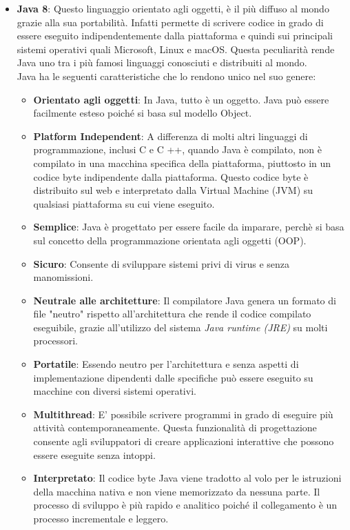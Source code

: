 \begin{itemize}
\item \textbf{Java 8}: Questo linguaggio orientato agli oggetti, è il più diffuso al mondo grazie alla sua portabilità. Infatti permette di scrivere codice in grado di essere eseguito indipendentemente dalla piattaforma e quindi sui principali sistemi operativi quali Microsoft, Linux e macOS. Questa peculiarità rende Java uno tra i più famosi linguaggi conosciuti e distribuiti al mondo.
\\Java ha le seguenti caratteristiche che lo rendono unico nel suo genere:
\begin{itemize}
\item \textbf{Orientato agli oggetti}: In Java, tutto è un oggetto. Java può essere facilmente esteso poiché si basa sul modello Object.
\item \textbf{Platform Independent}: A differenza di molti altri linguaggi di programmazione, inclusi C e C ++, quando Java è compilato, non è compilato in una macchina specifica della piattaforma, piuttosto in un codice byte indipendente dalla piattaforma. Questo codice byte è distribuito sul web e interpretato dalla Virtual Machine (JVM) su qualsiasi piattaforma su cui viene eseguito.
\item \textbf{Semplice}: Java è progettato per essere facile da imparare, perchè si basa sul concetto della programmazione orientata agli oggetti (OOP).
\item \textbf{Sicuro}: Consente di sviluppare sistemi privi di virus e senza manomissioni.
\item \textbf{Neutrale alle architetture}: Il compilatore Java genera un formato di file "neutro" rispetto all'architettura che rende il codice compilato eseguibile,  grazie all'utilizzo del sistema \textit{Java runtime (JRE)} su molti processori.
\item \textbf{Portatile}: Essendo neutro per l'architettura e senza aspetti di implementazione dipendenti dalle specifiche può essere eseguito su macchine con diversi sistemi operativi.
\item \textbf{Multithread}: E' possibile scrivere programmi in grado di eseguire più attività contemporaneamente. Questa funzionalità di progettazione consente agli sviluppatori di creare applicazioni interattive che possono essere eseguite senza intoppi.
\item \textbf{Interpretato}: Il codice byte Java viene tradotto al volo per le istruzioni della macchina nativa e non viene memorizzato da nessuna parte. Il processo di sviluppo è più rapido e analitico poiché il collegamento è un processo incrementale e leggero.

\end{itemize}
\end{itemize}
